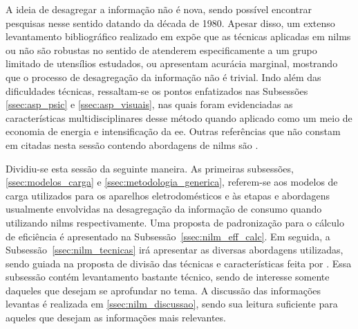 A ideia de desagregar a informação não é nova, sendo possível
encontrar pesquisas nesse sentido datando da década de 1980. Apesar
disso, um extenso levantamento bibliográfico
\cite{nilm_hart_1992_8,nilm_bouloutas_viterbi_ext_1991_11,
nilm_hart_fsm_viterbi_1993_12,nilm_norford_leeb_medianfilt_1996_13,
nilm_leeb_spectral_envelope_1995_23,
nilm_cole_data_extraction_1998_14,nilm_cole_extra_info_surge_1998_15,
nilm_powers_15minsamp_1991_16,nilm_farinaccio_16ssamp_1999_17,
nilm_marceau_16ssamp_improved_1999_18,nilm_baranski_genetic_base_2003_19,
nilm_baranski_genetic_detalhado_2004_20,nilm_baranski_summary_2004_21,
nilm_matthews_overview_2008_22,nilm_laughman_continuous_variables_2003_9,
nilm_lee_variable_speed_estimation_2005_24,
nilm_wichakool_2009_25,nilm_shaw_2008_26,nilm_srinivasan_nn_2006_27,
nilm_patel_2007_29,nilm_gupta_patel_2010_30,
nilm_sultanem_1991_10,nilm_chan_2000_31,nilm_lee_2004_32,nilm_lam_2007_33,
nilm_liang_pt1_2010_34,nilm_suzuki_2011_35,nilm_berges_2008_7,
nilm_berges_2009_36,2010_nilm_melhorando_pph_usa_37,
nilm_liang_pt2_2010_40} realizado em \citet*{nilm_zeifman_review_2011}
expõe que as técnicas aplicadas em \glspl{nilm} ou não são robustas no
sentido de atenderem especificamente a um grupo limitado de utensílios
estudados, ou apresentam acurácia marginal, mostrando que o processo
de desagregação da informação não é trivial. Indo além das
dificuldades técnicas, ressaltam-se os pontos enfatizados nas
Subsessões \ref{ssec:asp_psic} e \ref{ssec:asp_visuais}, nas quais
foram evidenciadas as características multidisciplinares desse método
quando aplicado como um meio de economia de energia e intensificação
da \gls{ee}. Outras referências que não constam em
\cite{nilm_zeifman_review_2011} citadas nesta sessão contendo
abordagens de \glspl{nilm} são
\cite{nilm_apresentacao_review_2011,
nilm_bergman_distribuido_2011,nilm_zeifman_vast_2011,
nilm_zeifman_vast_hisample_pdfmerge_2011,
nilm_zeifman_vastext_approach_2012,
nilm_zeifman_statistical_vastext_1stws_2012,
nilm_zeifman_statistical_naive_enduses_2013,
nilm_genetic_2013,nilm_patel_review_2011,
nilm_coppe_nascimento,nilm_itajuba_rodrigues,
wavelet_transients_2009,
seminilm_fhmm_empiricalnmeter_2013,
seminilm_ihome_tomek_2012,
seminilm_berges_multisensor_2010}.

Dividiu-se esta sessão da seguinte maneira. As primeiras subsessões,
\ref{ssec:modelos_carga} e \ref{ssec:metodologia_generica}, referem-se
aos modelos de carga utilizados para os aparelhos eletrodomésticos e
às etapas e abordagens usualmente envolvidas na desagregação da
informação de consumo quando utilizando \glspl{nilm} respectivamente.
Uma proposta de padronização para o cálculo de eficiência é
apresentado na Subsessão~\ref{ssec:nilm_eff_calc}. Em seguida, a
Subsessão~\ref{ssec:nilm_tecnicas} irá apresentar as diversas
abordagens utilizadas, sendo guiada na proposta de divisão das
técnicas e características feita por \cite{nilm_zeifman_review_2011}.
Essa subsessão contém levantamento bastante técnico, sendo de
interesse somente daqueles que desejam se aprofundar no tema.  A
discussão das informações levantas é realizada em
\ref{ssec:nilm_discussao}, sendo sua leitura suficiente para
aqueles que desejam as informações mais relevantes.

